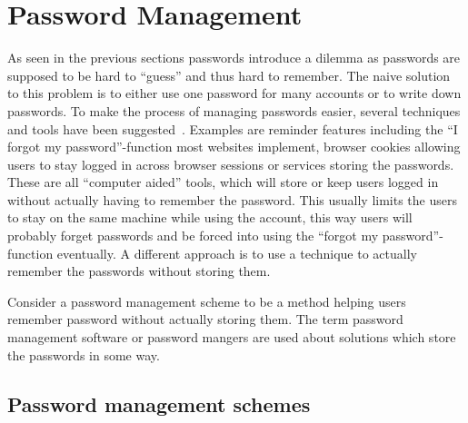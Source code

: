 \section{Password Management}
As seen in the previous sections passwords introduce a dilemma as passwords are supposed to be hard to ``guess'' and thus hard to remember. The naive solution to this problem is to either use one password for many accounts or to write down passwords. To make the process of managing passwords easier, several techniques and tools have been suggested~\cite{management-strategies}. Examples are reminder features including the ``I forgot my password''-function most websites implement, browser cookies allowing users to stay logged in across browser sessions or services storing the passwords. These are all ``computer aided'' tools, which will store or keep users logged in without actually having to remember the password. This usually limits the users to stay on the same machine while using the account, this way users will probably forget passwords and be forced into using the ``forgot my password''-function eventually. A different approach is to use a technique to actually remember the passwords without storing them.
\par Consider a password management scheme to be a method helping users remember password without actually storing them. The term password management software or password mangers are used about solutions which store the passwords in some way.

\subsection{Password management schemes}
 
